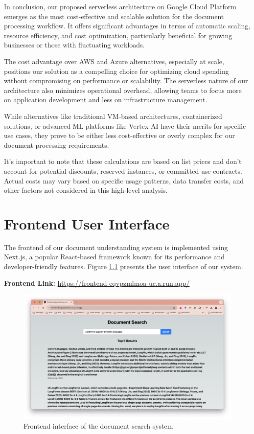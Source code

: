 \documentclass[a4paper, 12pt]{report}
\begin{document}
In conclusion, our proposed serverless architecture on Google Cloud Platform emerges as the most cost-effective and scalable solution for the document processing workflow. It offers significant advantages in terms of automatic scaling, resource efficiency, and cost optimization, particularly beneficial for growing businesses or those with fluctuating workloads.

The cost advantage over AWS and Azure alternatives, especially at scale, positions our solution as a compelling choice for optimizing cloud spending without compromising on performance or scalability. The serverless nature of our architecture also minimizes operational overhead, allowing teams to focus more on application development and less on infrastructure management.

While alternatives like traditional VM-based architectures, containerized solutions, or advanced ML platforms like Vertex AI have their merits for specific use cases, they prove to be either less cost-effective or overly complex for our document processing requirements.

It's important to note that these calculations are based on list prices and don't account for potential discounts, reserved instances, or committed use contracts. Actual costs may vary based on specific usage patterns, data transfer costs, and other factors not considered in this high-level analysis.

\chapter{Frontend User Interface}

The frontend of our document understanding system is implemented using Next.js, a popular React-based framework known for its performance and developer-friendly features. Figure \ref{fig:frontend-screenshot} presents the user interface of our system.

\textbf{Frontend Link:} \url{https://frontend-eqvpzmlmoa-uc.a.run.app/}

\begin{figure}[htbp]
    \centering
    \includegraphics[width=\textwidth]{frontend-1.png}
    \caption{Frontend interface of the document search system}
    \label{fig:frontend-screenshot}
\end{figure}
\end{document}
